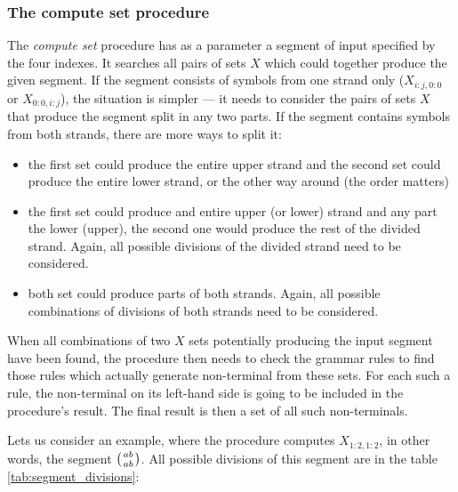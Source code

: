 \subsubsection{The compute set procedure}
The \textit{compute set} procedure has as a parameter a segment of input specified by the four indexes. It searches all pairs of sets $X$ which could together produce the given segment. If the segment consists of symbols from one strand only ($X_{i:j,0:0}$ or $X_{0:0,i:j}$), the situation is simpler --- it needs to consider the pairs of sets $X$ that produce the segment split in any two parts. If the segment contains symbols from both strands, there are more ways to split it:

\begin{itemize}
  \item{the first set could produce the entire upper strand and the second set could produce the entire lower strand, or the other way around (the order matters)}
  \item{the first set could produce and entire upper (or lower) strand and any part the lower (upper), the second one would produce the rest of the divided strand. Again, all possible divisions of the divided strand need to be considered.}
  \item{both set could produce parts of both strands. Again, all possible combinations of divisions of both strands need to be considered.}
\end{itemize}

When all combinations of two $X$ sets potentially producing the input segment have been found, the procedure then needs to check the grammar rules to find those rules which actually generate non-terminal from these sets. For each such a rule, the non-terminal on its left-hand side is going to be included in the procedure's result. The final result is then a set of all such non-terminals.

Lets us consider an example, where the procedure computes $X_{1:2,1:2}$, in other words, the segment $\wkpair{ab}{ab}$. All possible divisions of this segment are in the table \ref{tab:segment_divisions}:


